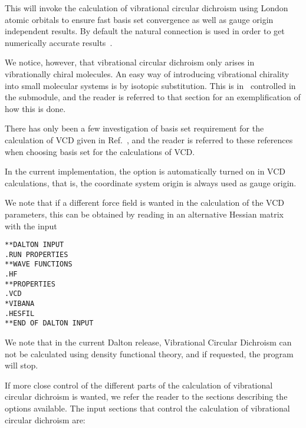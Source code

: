 This will invoke the calculation of vibrational circular dichroism
using London atomic orbitals to ensure fast
basis set convergence as
well as gauge origin independent results. By
default the natural
connection is used in order to get
numerically accurate
results~\cite{joklbkrthpjtca90,krthjopjklbcpl235}.

We notice, however, that vibrational circular dichroism only arises in
vibrationally chiral molecules. An easy way of introducing
vibrational chirality into small molecular systems is by isotopic
substitution. This is in
\dalton\ controlled in the  submodule, and the reader is
referred to that section for an exemplification of how this is done.

There has only  been a few investigation of basis set requirement for
the calculation of VCD given in
Ref.~\cite{klbpjthkrhjajjcp100,klbpjthkrfd99},
and the reader is referred to these references when choosing basis set
for the calculations of VCD.

In the current implementation, the  option is automatically
turned on in VCD calculations, that is, the coordinate system origin
is always used as gauge origin.

We note that if a different force field is wanted in the calculation
of the VCD parameters, this can be obtained by reading in an
alternative Hessian matrix with the input

\begin{verbatim}
**DALTON INPUT
.RUN PROPERTIES
**WAVE FUNCTIONS
.HF
**PROPERTIES
.VCD
*VIBANA
.HESFIL
**END OF DALTON INPUT
\end{verbatim}

We note that in the current Dalton release, Vibrational Circular
Dichroism can not be calculated using density functional theory, and if
requested, the program will stop.

If more close control of the different parts of the calculation of
vibrational circular dichroism is wanted, we refer the reader to the
sections describing the options available. The input sections that control
the calculation of vibrational circular dichroism are:

